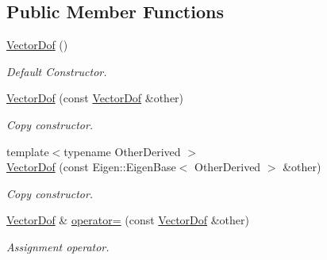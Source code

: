 \subsection*{Public Member Functions}
\begin{DoxyCompactItemize}
\item 
\hyperlink{classow__core_1_1VectorDof_a488ac8cc1bfe0683f6d348eca855735d}{Vector\+Dof} ()\hypertarget{classow__core_1_1VectorDof_a488ac8cc1bfe0683f6d348eca855735d}{}\label{classow__core_1_1VectorDof_a488ac8cc1bfe0683f6d348eca855735d}

\begin{DoxyCompactList}\small\item\em Default Constructor. \end{DoxyCompactList}\item 
\hyperlink{classow__core_1_1VectorDof_a76248e881b5fd929c545fd8004a29686}{Vector\+Dof} (const \hyperlink{classow__core_1_1VectorDof}{Vector\+Dof} \&other)\hypertarget{classow__core_1_1VectorDof_a76248e881b5fd929c545fd8004a29686}{}\label{classow__core_1_1VectorDof_a76248e881b5fd929c545fd8004a29686}

\begin{DoxyCompactList}\small\item\em Copy constructor. \end{DoxyCompactList}\item 
{\footnotesize template$<$typename Other\+Derived $>$ }\\\hyperlink{classow__core_1_1VectorDof_a52fb1369e02f8b20b6510f6bdef6ca12}{Vector\+Dof} (const Eigen\+::\+Eigen\+Base$<$ Other\+Derived $>$ \&other)
\begin{DoxyCompactList}\small\item\em Copy constructor. \end{DoxyCompactList}\item 
\hyperlink{classow__core_1_1VectorDof}{Vector\+Dof} \& \hyperlink{classow__core_1_1VectorDof_af3f92efd0ed4277766de7f3be743c43f}{operator=} (const \hyperlink{classow__core_1_1VectorDof}{Vector\+Dof} \&other)\hypertarget{classow__core_1_1VectorDof_af3f92efd0ed4277766de7f3be743c43f}{}\label{classow__core_1_1VectorDof_af3f92efd0ed4277766de7f3be743c43f}

\begin{DoxyCompactList}\small\item\em Assignment operator. \end{DoxyCompactList}\end{DoxyCompactItemize}


